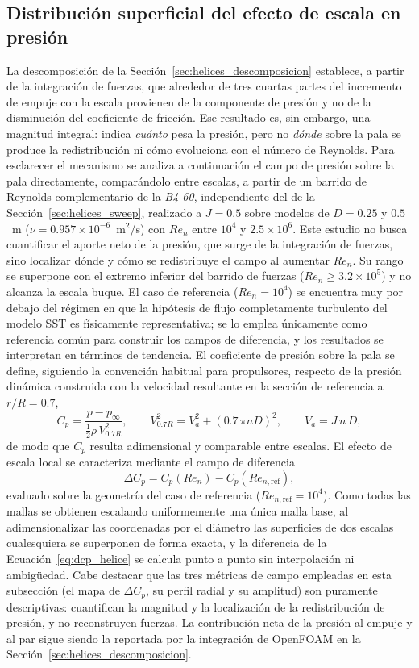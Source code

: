 \subsection{Distribución superficial del efecto de escala en presión}
\label{sec:helices_campo_presion}
La descomposición de la Sección~\ref{sec:helices_descomposicion} establece, a partir de la integración de fuerzas, que alrededor de tres cuartas partes del incremento de empuje con la escala provienen de la componente de presión y no de la disminución del coeficiente de fricción. Ese resultado es, sin embargo, una magnitud integral: indica \emph{cuánto} pesa la presión, pero no \emph{dónde} sobre la pala se produce la redistribución ni cómo evoluciona con el número de Reynolds. Para esclarecer el mecanismo se analiza a continuación el campo de presión sobre la pala directamente, comparándolo entre escalas, a partir de un barrido de Reynolds complementario de la \textit{B4-60}, independiente del de la Sección~\ref{sec:helices_sweep}, realizado a $J=0.5$ sobre modelos de $D=0.25$ y $0.5$~m ($\nu=0.957\times10^{-6}$~m$^2$/s) con $Re_n$ entre $10^4$ y $2.5\times10^6$. Este estudio no busca cuantificar el aporte neto de la presión, que surge de la integración de fuerzas, sino localizar dónde y cómo se redistribuye el campo al aumentar $Re_n$. Su rango se superpone con el extremo inferior del barrido de fuerzas ($Re_n\geq3.2\times10^5$) y no alcanza la escala buque. El caso de referencia ($Re_n=10^4$) se encuentra muy por debajo del régimen en que la hipótesis de flujo completamente turbulento del modelo SST es físicamente representativa; se lo emplea únicamente como referencia común para construir los campos de diferencia, y los resultados se interpretan en términos de tendencia.
El coeficiente de presión sobre la pala se define, siguiendo la convención habitual para propulsores, respecto de la presión dinámica construida con la velocidad resultante en la sección de referencia a $r/R=0.7$,
\begin{equation}
C_p = \frac{p - p_\infty}{\tfrac{1}{2}\rho\,V_{0.7R}^2},
\qquad
V_{0.7R}^2 = V_a^2 + \left(0.7\,\pi n D\right)^2,
\qquad
V_a = J\,n\,D,
\label{eq:cp_helice}
\end{equation}
de modo que $C_p$ resulta adimensional y comparable entre escalas. El efecto de escala local se caracteriza mediante el campo de diferencia
\begin{equation}
\Delta C_p = C_{p}(Re_n) - C_{p}(Re_{n,\mathrm{ref}}),
\label{eq:dcp_helice}
\end{equation}
evaluado sobre la geometría del caso de referencia ($Re_{n,\mathrm{ref}}=10^4$). Como todas las mallas se obtienen escalando uniformemente una única malla base, al adimensionalizar las coordenadas por el diámetro las superficies de dos escalas cualesquiera se superponen de forma exacta, y la diferencia de la Ecuación~\ref{eq:dcp_helice} se calcula punto a punto sin interpolación ni ambigüedad. Cabe destacar que las tres métricas de campo empleadas en esta subsección (el mapa de $\Delta C_p$, su perfil radial y su amplitud) son puramente descriptivas: cuantifican la magnitud y la localización de la redistribución de presión, y no reconstruyen fuerzas. La contribución neta de la presión al empuje y al par sigue siendo la reportada por la integración de OpenFOAM en la Sección~\ref{sec:helices_descomposicion}.
